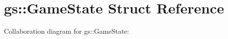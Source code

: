 \hypertarget{structgs_1_1GameState}{}\section{gs\+:\+:Game\+State Struct Reference}
\label{structgs_1_1GameState}


Collaboration diagram for gs\+:\+:Game\+State\+:

